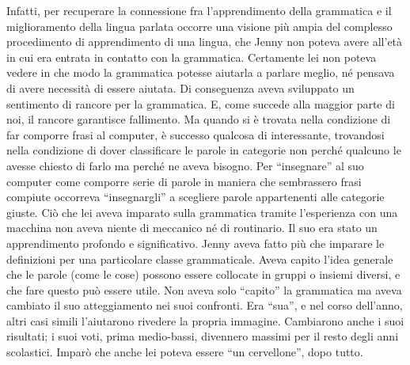 Infatti, per recuperare la connessione fra l'apprendimento della grammatica e il miglioramento della lingua parlata occorre una visione più ampia del complesso procedimento di apprendimento di una lingua, che Jenny non poteva avere all'età in cui era entrata in contatto con la grammatica. Certamente lei non poteva vedere in che modo la grammatica potesse aiutarla a parlare meglio, né pensava di avere necessità di essere aiutata. Di conseguenza aveva sviluppato un sentimento di rancore per la grammatica. E, come succede alla maggior parte di noi, il rancore garantisce fallimento. Ma quando si è trovata nella condizione di far comporre frasi al computer, è successo qualcosa di interessante, trovandosi nella condizione di dover classificare le parole in categorie non perché qualcuno le avesse chiesto di farlo ma perché ne aveva bisogno. Per “insegnare” al suo computer come comporre serie di parole in maniera che sembrassero frasi compiute occorreva “insegnargli” a scegliere parole appartenenti alle categorie giuste. Ciò che lei aveva imparato sulla grammatica tramite l'esperienza con una  macchina non aveva niente di meccanico né di routinario. Il suo era stato un apprendimento profondo e significativo. Jenny aveva fatto più che imparare le definizioni per una particolare classe grammaticale. Aveva capito l'idea generale che le parole (come le cose) possono essere collocate in gruppi o insiemi diversi, e che fare questo può essere utile. Non aveva solo “capito” la grammatica ma aveva cambiato il suo atteggiamento nei suoi confronti. Era “sua”, e nel corso dell'anno, altri casi simili l'aiutarono rivedere la propria immagine. Cambiarono anche i suoi risultati; i suoi voti, prima medio-bassi, divennero massimi per il resto degli anni scolastici. Imparò che anche  lei poteva essere “un cervellone”, dopo tutto.

